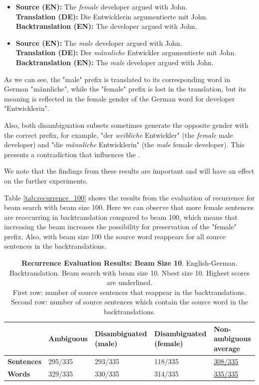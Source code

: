 \begin{itemize}
    \item \textbf{Source (EN):} The \textit{female} developer argued with John. \\
    \textbf{Translation (DE):} Die Entwicklerin argumentierte mit John. \\
    \textbf{Backtranslation (EN):} The developer argued with John.
    
    \item \textbf{Source (EN):} The \textit{male} developer argued with John. \\
    \textbf{Translation (DE):} Der \textit{männliche} Entwickler argumentierte mit John. \\
    \textbf{Backtranslation (EN):} The \textit{male} developer argued with John.
\end{itemize}

As we can see, the "male" prefix is translated to its corresponding word in German "männliche", while the "female" prefix is lost in the translation, but its meaning is reflected in the female gender of the German word for developer "Entwicklerin".

Also, both disambiguation subsets sometimes generate the opposite gender with the correct prefix, for example, "der \textit{weibliche} Entwickler" (the \textit{female} male developer) and "die \textit{männliche} Entwicklerin" (the \textit{male} female developer). This presents a contradiction that influences the . 

We note that the findings from these results are important and will have an effect on the further experiments.

Table \ref{tab:recurrence_100} shows the results from the evaluation of recurrence for beam search with beam size 100. Here we can observe that more female sentences are reoccurring in backtranslation compared to beam 100, which means that increasing the beam increases the possibility for preservation of the "female" prefix.
Also, with beam size 100 the source word reappears for all source sentences in the backtranslations.

\begin{table} 
    \begin{tabularx}{\linewidth}{|X|XXXX|}
        \hline
         & \textbf{Ambiguous} & \textbf{Disambiguated (male)} & \textbf{Disambiguated (female)} & \textbf{Non-ambiguous average} \\ \hline
         \textbf{Sentences} & 295/335 & 293/335 & 118/335 & \underline{308/335} \\ 
         \textbf{Words} & 329/335 & 330/335 & 314/335 & \underline{335/335} \\ \hline
    \end{tabularx}
    \caption{\textbf{Recurrence Evaluation Results: Beam Size 10}. English-German. Backtranslation. Beam search with beam size 10. Nbest size 10. Highest scores are underlined. \\ First row: number of source sentences that reappear in the backtranslations. \\ Second row: number of source sentences which contain the source word in the backtranslations.}
    \label{tab:recurrence_10}
\end{table}

